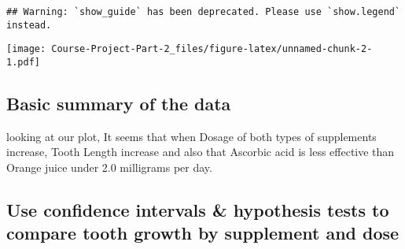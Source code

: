 \documentclass[
]{article}
\newenvironment{Shaded}{\begin{snugshade}}{\end{snugshade}}
\newcommand{\AttributeTok}[1]{\textcolor[rgb]{0.77,0.63,0.00}{#1}}
\newcommand{\ConstantTok}[1]{\textcolor[rgb]{0.00,0.00,0.00}{#1}}
\newcommand{\FunctionTok}[1]{\textcolor[rgb]{0.00,0.00,0.00}{#1}}
\newcommand{\NormalTok}[1]{#1}
\newcommand{\OtherTok}[1]{\textcolor[rgb]{0.56,0.35,0.01}{#1}}
\newcommand{\SpecialCharTok}[1]{\textcolor[rgb]{0.00,0.00,0.00}{#1}}
\newcommand{\StringTok}[1]{\textcolor[rgb]{0.31,0.60,0.02}{#1}}
\begin{document}
\begin{Shaded}
\end{Shaded}

\begin{verbatim}
## Warning: `show_guide` has been deprecated. Please use `show.legend` instead.
\end{verbatim}

\texttt{[image: Course-Project-Part-2\_files/figure-latex/unnamed-chunk-2-1.pdf]}

\hypertarget{basic-summary-of-the-data}{%
\subsection{Basic summary of the data}\label{basic-summary-of-the-data}}

looking at our plot, It seems that when Dosage of both types of
supplements increase, Tooth Length increase and also that Ascorbic acid
is less effective than Orange juice under 2.0 milligrams per day.

\hypertarget{use-confidence-intervals-hypothesis-tests-to-compare-tooth-growth-by-supplement-and-dose}{%
\subsection{Use confidence intervals \& hypothesis tests to compare
tooth growth by supplement and
dose}\label{use-confidence-intervals-hypothesis-tests-to-compare-tooth-growth-by-supplement-and-dose}}
\end{document}
